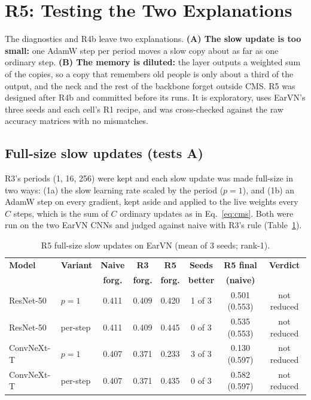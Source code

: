 \documentclass[12pt,a4paper]{report}
\begin{document}
\section{R5: Testing the Two Explanations}\label{sec:r5}
The diagnostics and R4b leave two explanations. \textbf{(A) The slow update is too small:} one AdamW step per period moves a slow copy about as far as one ordinary step. \textbf{(B) The memory is diluted:} the layer outputs a weighted sum of the copies, so a copy that remembers old people is only about a third of the output, and the neck and the rest of the backbone forget outside CMS. R5 was designed after R4b and committed before its runs. It is exploratory, uses EarVN's three seeds and each cell's R1 recipe, and was cross-checked against the raw accuracy matrices with no mismatches.

\subsection{Full-size slow updates (tests A)}
R3's periods (1, 16, 256) were kept and each slow update was made full-size in two ways: (1a) the slow learning rate scaled by the period ($p = 1$), and (1b) an AdamW step on every gradient, kept aside and applied to the live weights every $C$ steps, which is the sum of $C$ ordinary updates as in Eq.~\ref{eq:cms}. Both were run on the two EarVN CNNs and judged against naive with R3's rule (Table~\ref{tab:r5}).

\begin{table}[H]
\centering
\small
\caption{R5 full-size slow updates on EarVN (mean of 3 seeds; rank-1).}
\label{tab:r5}
\begin{tabular}{|l|l|c|c|c|c|c|c|}
\hline
\textbf{Model} & \textbf{Variant} & \textbf{Naive} & \textbf{R3} & \textbf{R5} & \textbf{Seeds} & \textbf{R5 final} & \textbf{Verdict} \\
 & & \textbf{forg.} & \textbf{forg.} & \textbf{forg.} & \textbf{better} & \textbf{(naive)} & \\
\hline
ResNet-50 & $p = 1$ & 0.411 & 0.409 & 0.420 & 1 of 3 & 0.501 (0.553) & not reduced \\
ResNet-50 & per-step & 0.411 & 0.409 & 0.445 & 0 of 3 & 0.535 (0.553) & not reduced \\
ConvNeXt-T & $p = 1$ & 0.407 & 0.371 & 0.233 & 3 of 3 & 0.130 (0.597) & not reduced \\
ConvNeXt-T & per-step & 0.407 & 0.371 & 0.435 & 0 of 3 & 0.582 (0.597) & not reduced \\
\hline
\end{tabular}
\end{table}
\end{document}
